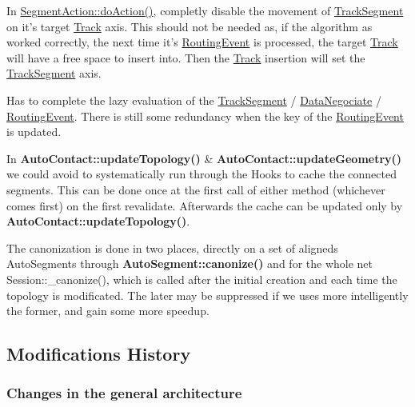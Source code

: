 \begin{DoxyItemize}
\item In \hyperlink{classKite_1_1SegmentAction_a324f17f0f5a09b76344eb2e003695d74}{Segment\-Action\-::do\-Action()}, completly disable the movement of \hyperlink{classKite_1_1TrackSegment}{Track\-Segment} on it's target \hyperlink{classKite_1_1Track}{Track} axis. This should not be needed as, if the algorithm as worked correctly, the next time it's \hyperlink{classKite_1_1RoutingEvent}{Routing\-Event} is processed, the target \hyperlink{classKite_1_1Track}{Track} will have a free space to insert into. Then the \hyperlink{classKite_1_1Track}{Track} insertion will set the \hyperlink{classKite_1_1TrackSegment}{Track\-Segment} axis.
\item Has to complete the lazy evaluation of the \hyperlink{classKite_1_1TrackSegment}{Track\-Segment} / \hyperlink{classKite_1_1DataNegociate}{Data\-Negociate} / \hyperlink{classKite_1_1RoutingEvent}{Routing\-Event}. There is still some redundancy when the key of the \hyperlink{classKite_1_1RoutingEvent}{Routing\-Event} is updated.
\item In {\bf Auto\-Contact\-::update\-Topology()} \& {\bf Auto\-Contact\-::update\-Geometry()} we could avoid to systematically run through the Hooks to cache the connected segments. This can be done once at the first call of either method (whichever comes first) on the first revalidate. Afterwards the cache can be updated only by {\bf Auto\-Contact\-::update\-Topology()}.
\item The canonization is done in two places, directly on a set of aligneds Auto\-Segments through {\bf Auto\-Segment\-::canonize()} and for the whole net Session\-::\-\_\-canonize(), which is called after the initial creation and each time the topology is modificated. The later may be suppressed if we uses more intelligently the former, and gain some more speedup.
\end{DoxyItemize}\hypertarget{pageNotes_secModificationsHistory}{}\subsection{Modifications History}\label{pageNotes_secModificationsHistory}
\hypertarget{pageNotes_ssecArchitectureChanges}{}\subsubsection{Changes in the general architecture}\label{pageNotes_ssecArchitectureChanges}

